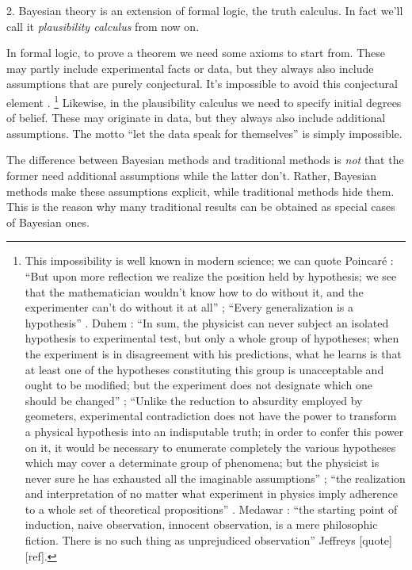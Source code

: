 \documentclass[\ifafour a4paper,12pt,\else a5paper,10pt,\fi%
onecolumn,oneside,article,%
british%
]{memoir}
\theoremstyle{remark}
\theoremstyle{innote}
\let\parentext=\parentexttrack%
\newcommand*{\citep}{\parencites}
\newcommand*{\citey}{\parencites*}
\renewcommand*{\|}{\mathpunct{|}}
\newcommand*{\sect}{\S}%
\newcommand*{\chap}{ch.}%
\newcommand*{\dobs}{degrees of belief}
\begin{document}
\medskip

2. Bayesian theory is an extension of formal logic, the truth calculus. In
fact we'll call it \emph{plausibility calculus} from now on.

In formal logic, to prove a theorem we need some axioms to start from.
These may partly include experimental facts or data, but they always also
include assumptions that are purely conjectural. It's impossible to avoid
this conjectural element \citep[see for example][]{harding1976}.
\footnote{This impossibility is well known in modern science; we can quote
  Poincar\'e \citey{poincare1902_r1992}: \enquote{But upon more reflection
    we realize the position held by hypothesis; we see that the
    mathematician wouldn't know how to do without it, and the experimenter
    can't do without it at all} \parentext{Introduction}; \enquote{Every
    generalization is a hypothesis} \parentext{\chap~IX, p.~176}. Duhem
  \citey{duhem1906_t1991}: \enquote{In sum, the physicist can never subject
    an isolated hypothesis to experimental test, but only a whole group of
    hypotheses; when the experiment is in disagreement with his
    predictions, what he learns is that at least one of the hypotheses
    constituting this group is unacceptable and ought to be modified; but
    the experiment does not designate which one should be changed}
  \parentext{\sect~VI.2, p.~187}; \enquote{Unlike the reduction to
    absurdity employed by geometers, experimental contradiction does not
    have the power to transform a physical hypothesis into an indisputable
    truth; in order to confer this power on it, it would be necessary to
    enumerate completely the various hypotheses which may cover a
    determinate group of phenomena; but the physicist is never sure he has
    exhausted all the imaginable assumptions} \parentext{\sect~VI.3,
    p.~190}; \enquote{the realization and interpretation of no matter what
    experiment in physics imply adherence to a whole set of theoretical
    propositions} \parentext{\sect~VI.5, p.~200}. Medawar
  \citey{medawar1963}: \enquote{the starting point of induction, naive
    observation, innocent observation, is a mere philosophic fiction. There
    is no such thing as unprejudiced observation} Jeffreys [quote][ref].}
Likewise, in the plausibility calculus we need to specify initial \dobs.
These may originate in data, but they always also include additional
assumptions. The motto \enquote{let the data speak for themselves} is
simply impossible.

The difference between Bayesian methods and traditional methods is
\emph{not} that the former need additional assumptions while the latter
don't. Rather, Bayesian methods make these assumptions explicit, while
traditional methods hide them. This is the reason why many traditional
results can be obtained as special cases of Bayesian ones.
\end{document}
